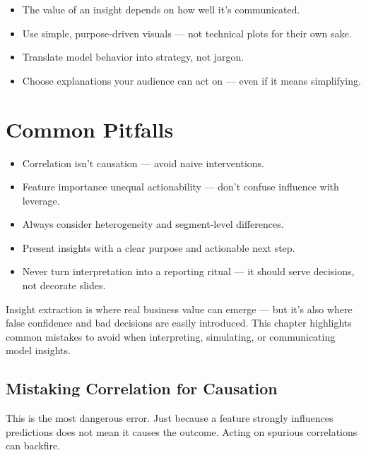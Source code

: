 \documentclass[12pt,openany, draft]{book}
\begin{document}
\begin{summarybox}
\begin{itemize}
  \item The value of an insight depends on how well it’s communicated.
  \item Use simple, purpose-driven visuals — not technical plots for their own sake.
  \item Translate model behavior into strategy, not jargon.
  \item Choose explanations your audience can act on — even if it means simplifying.
\end{itemize}
\end{summarybox}




\chapter{Common Pitfalls}

\begin{summarybox}
\begin{itemize}
  \item Correlation isn’t causation — avoid naive interventions.
  \item Feature importance unequal actionability — don’t confuse influence with leverage.
  \item Always consider heterogeneity and segment-level differences.
  \item Present insights with a clear purpose and actionable next step.
  \item Never turn interpretation into a reporting ritual — it should serve decisions, not decorate slides.
\end{itemize}
\end{summarybox}

Insight extraction is where real business value can emerge — but it’s also where false confidence and bad decisions are easily introduced. This chapter highlights common mistakes to avoid when interpreting, simulating, or communicating model insights.



\section{Mistaking Correlation for Causation}

This is the most dangerous error. Just because a feature strongly influences predictions does not mean it causes the outcome. Acting on spurious correlations can backfire.
\end{document}

